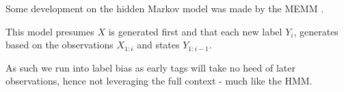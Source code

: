 \documentclass[../main.tex]{subfiles}
\begin{document}
Some development on the hidden Markov model was made by the MEMM \autocite{mccallum-2000-maximum}.



This model presumes $X$ is generated first and that each new label $Y_i$, generates based on the observations $X_{1:i}$ and states $Y_{1:i-1}$.

As such we run into label bias as early tags will take no heed of later observations, hence not leveraging the full context - much like the HMM.
\end{document}
